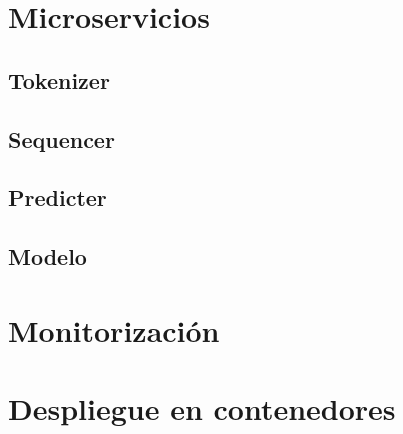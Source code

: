 \section{Microservicios}

\subsection{Tokenizer}
\subsection{Sequencer}
\subsection{Predicter}


\subsection{Modelo}



\section{Monitorización}


\section{Despliegue en contenedores}




